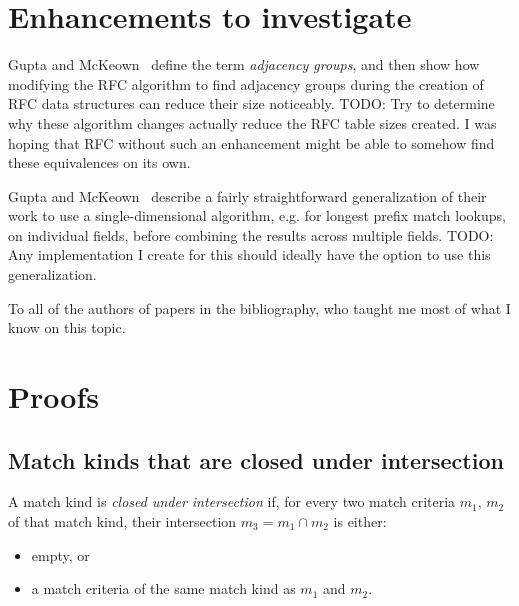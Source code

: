\documentclass[acmsmall]{acmart}
\newcommand{\todo}[1]{}
\renewcommand{\todo}[1]{{\color{red} TODO: {#1}}}
\begin{document}
\section{Enhancements to investigate}

Gupta and McKeown~\cite[Sec. 7.1]{GM1999a} define the term
{\em adjacency groups}, and then show how modifying the RFC algorithm
to find adjacency groups during the creation of RFC data structures
can reduce their size noticeably.
\todo{Try to determine why these algorithm changes actually reduce
the RFC table sizes created.  I was hoping that RFC without such
an enhancement might be able to somehow find these equivalences on its own.}

Gupta and McKeown~\cite[Sec. 7]{GM1999a} describe a fairly
straightforward generalization of their work to use a single-dimensional
algorithm, e.g. for longest prefix match lookups, on individual fields,
before combining the results across multiple fields.
\todo{Any implementation I create for this should ideally have the option
to use this generalization.}

\begin{acks}
To all of the authors of papers in the bibliography, who taught
me most of what I know on this topic.
\end{acks}




\appendix

\section{Proofs}

\subsection{Match kinds that are closed under intersection}

\begin{definition}
\label{defn:closedunderintersection}
A match kind is {\em closed under intersection} if,
for every two match criteria $m_1$, $m_2$ of that match kind,
their intersection $m_3 = m_1 \cap m_2$ is either:
\begin{itemize}
\item empty, or
\item a match criteria of the same match kind as $m_1$ and $m_2$.
\end{itemize}
\end{definition}
\end{document}
